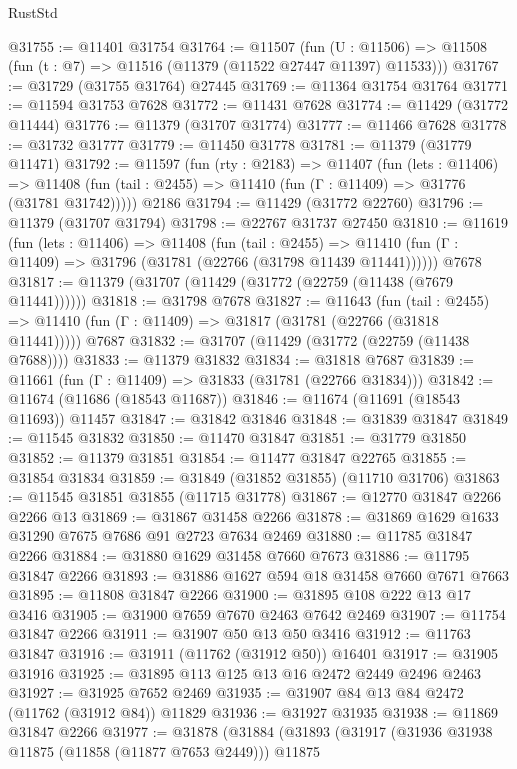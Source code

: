 \begin{lexlean}{RustStd}
\begin{coremodule}
@31755 := @11401 @31754
@31764 := @11507
    (fun (U : @11506) => @11508 (fun (t : @7) => @11516 (@11379 (@11522 @27447 @11397) @11533)))
@31767 := @31729 (@31755 @31764) @27445
@31769 := @11364 @31754 @31764
@31771 := @11594 @31753 @7628
@31772 := @11431 @7628
@31774 := @11429 (@31772 @11444)
@31776 := @11379 (@31707 @31774)
@31777 := @11466 @7628
@31778 := @31732 @31777
@31779 := @11450 @31778
@31781 := @11379 (@31779 @11471)
@31792 := @11597
    (fun (rty : @2183) =>
    @11407
      (fun (lets : @11406) =>
      @11408 (fun (tail : @2455) => @11410 (fun (Γ : @11409) => @31776 (@31781 @31742)))))
    @2186
@31794 := @11429 (@31772 @22760)
@31796 := @11379 (@31707 @31794)
@31798 := @22767 @31737 @27450
@31810 := @11619
    (fun (lets : @11406) =>
    @11408
      (fun (tail : @2455) =>
      @11410 (fun (Γ : @11409) => @31796 (@31781 (@22766 (@31798 @11439 @11441))))))
    @7678
@31817 := @11379 (@31707 (@11429 (@31772 (@22759 (@11438 (@7679 @11441))))))
@31818 := @31798 @7678
@31827 := @11643
    (fun (tail : @2455) => @11410 (fun (Γ : @11409) => @31817 (@31781 (@22766 (@31818 @11441)))))
    @7687
@31832 := @31707 (@11429 (@31772 (@22759 (@11438 @7688))))
@31833 := @11379 @31832
@31834 := @31818 @7687
@31839 := @11661 (fun (Γ : @11409) => @31833 (@31781 (@22766 @31834)))
@31842 := @11674 (@11686 (@18543 @11687))
@31846 := @11674 (@11691 (@18543 @11693)) @11457
@31847 := @31842 @31846
@31848 := @31839 @31847
@31849 := @11545 @31832
@31850 := @11470 @31847
@31851 := @31779 @31850
@31852 := @11379 @31851
@31854 := @11477 @31847 @22765
@31855 := @31854 @31834
@31859 := @31849 (@31852 @31855) (@11710 @31706)
@31863 := @11545 @31851 @31855 (@11715 @31778)
@31867 := @12770 @31847 @2266 @2266 @13
@31869 := @31867 @31458 @2266
@31878 := @31869 @1629 @1633 @31290 @7675 @7686 @91 @2723 @7634 @2469
@31880 := @11785 @31847 @2266
@31884 := @31880 @1629 @31458 @7660 @7673
@31886 := @11795 @31847 @2266
@31893 := @31886 @1627 @594 @18 @31458 @7660 @7671 @7663
@31895 := @11808 @31847 @2266
@31900 := @31895 @108 @222 @13 @17 @3416
@31905 := @31900 @7659 @7670 @2463 @7642 @2469
@31907 := @11754 @31847 @2266
@31911 := @31907 @50 @13 @50 @3416
@31912 := @11763 @31847
@31916 := @31911 (@11762 (@31912 @50)) @16401
@31917 := @31905 @31916
@31925 := @31895 @113 @125 @13 @16 @2472 @2449 @2496 @2463
@31927 := @31925 @7652 @2469
@31935 := @31907 @84 @13 @84 @2472 (@11762 (@31912 @84)) @11829
@31936 := @31927 @31935
@31938 := @11869 @31847 @2266
@31977 := @31878
    (@31884
      (@31893
        (@31917
          (@31936 @31938 @11875 (@11858 (@11877 @7653 @2449)))
          @11875

\end{coremodule}
\end{lexlean}
